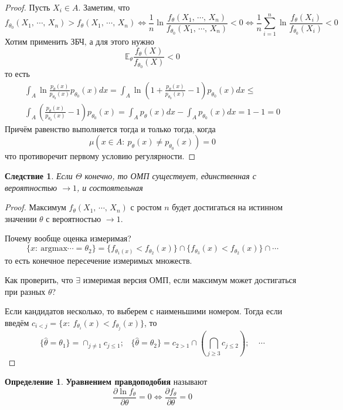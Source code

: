 \documentclass[a4paper,12pt]{article}
\renewcommand{\leq}{\ensuremath{\leqslant}}
\renewcommand{\geq}{\ensuremath{\geqslant}}
\theoremstyle{plain}
\newtheorem*{corollary}{Следствие}
\theoremstyle{definition}
\newtheorem{definition}{Определение}[section]
\theoremstyle{remark}
\begin{document}
\begin{proof}
  Пусть $X_i \in A$. Заметим, что
  \[
    f_{\theta_0}(X_1,\,\cdots,\,X_n) > f_\theta(X_1,\,\cdots,\,X_n) \Leftrightarrow \frac{1}{n}\ln\frac{f_\theta(X_1,\,\cdots,\,X_n)}{f_{\theta_0}(X_1,\,\cdots,\,X_n)} < 0 \Leftrightarrow \frac{1}{n}\sum_{i = 1}^n\ln\frac{f_\theta(X_i)}{f_{\theta_0}(X_i)} < 0
  \]
  Хотим применить ЗБЧ, а для этого нужно
  \[
    \mathbb{E}_\theta\frac{f_\theta(X)}{f_{\theta_0}(X)} < 0
  \]
  то есть
  \begin{align*}
    \int_A\ln\frac{p_\theta(x)}{p_{\theta_0}(x)}p_{\theta_0}(x)dx = \int_A\ln\left(1 + \frac{p_\theta(x)}{p_{\theta_0}(x)} - 1\right)p_{\theta_0}(x)dx \leq\\
    \int_A\left(\frac{p_\theta(x)}{p_{\theta_0}(x)} - 1\right)p_{\theta_0}(x) = \int_Ap_\theta(x)dx - \int_Ap_{\theta_0}(x)dx = 1 - 1 = 0 
  \end{align*}
  Причём равенство выполняется тогда и только тогда, когда
  \[
    \mu(x \in A :\: p_\theta(x) \neq p_{\theta_0}(x)) = 0
  \]
  что противоречит первому условию регулярности.
\end{proof}

\begin{corollary}
  Если $\Theta$ конечно, то ОМП существует, единственная с вероятностью $\to 1$, и состоятельная
\end{corollary}

\begin{proof}
  Максимум $f_\theta(X_1,\,\cdots,\,X_n)$ с ростом $n$ будет достигаться на истинном значении $\theta$ с вероятностью $\to 1$.

  Почему вообще оценка измеримая?
  \[
    \{x :\: \text{argmax}\cdots = \theta_2\} = \{f_{\theta_1(x)} < f_{\theta_2}(x)\}\cap\{f_{\theta_3}(x) < f_{\theta_2}(x)\}\cap\cdots
  \]
  то есть конечное пересечение измеримых множеств.

  Как проверить, что $\exists$ измеримая версия ОМП, если максимум может достигаться при разных $\theta$?

  Если кандидатов несколько, то выберем с наименьшими номером. Тогда если введём $c_{i < j} = \{x :\: f_{\theta_i}(x) < f_{\theta_j}(x)\}$, то
  \[
    \{\hat{\theta} = \theta_1\} = \cap_{j \neq 1}c_{j \leq 1};\;\;\; \{\hat{\theta} = \theta_2\} = c_{2 > 1} \cap (\bigcap_{j \geq 3}c_{j \leq 2});\;\;\;\;\cdots
  \]
\end{proof}

\begin{definition}
  \textbf{Уравнением правдоподобия} называют
  \[
    \frac{\partial\ln f_\theta}{\partial\theta} = 0 \Leftrightarrow \frac{\partial f_\theta}{\partial\theta} = 0
  \]
\end{definition}
\end{document}
